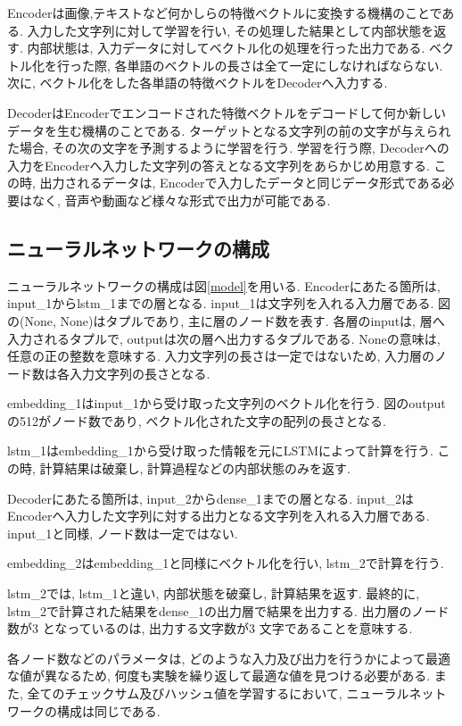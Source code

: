 \documentclass[11pt]{jbook}
\begin{document}
Encoderは画像,テキストなど何かしらの特徴ベクトルに変換する機構のことである.
入力した文字列に対して学習を行い, その処理した結果として内部状態を返す.
内部状態は, 入力データに対してベクトル化の処理を行った出力である.
ベクトル化を行った際, 各単語のベクトルの長さは全て一定にしなければならない.
次に, ベクトル化をした各単語の特徴ベクトルをDecoderへ入力する.

DecoderはEncoderでエンコードされた特徴ベクトルをデコードして何か新しいデータを生む機構のことである.
ターゲットとなる文字列の前の文字が与えられた場合, その次の文字を予測するように学習を行う.
学習を行う際, Decoderへの入力をEncoderへ入力した文字列の答えとなる文字列をあらかじめ用意する.
この時, 出力されるデータは, Encoderで入力したデータと同じデータ形式である必要はなく, 音声や動画など様々な形式で出力が可能である.

\subsection{ニューラルネットワークの構成}
ニューラルネットワークの構成は図\ref{model}を用いる.
Encoderにあたる箇所は, input\_1からlstm\_1までの層となる.
input\_1は文字列を入れる入力層である.
図の(None, None)はタプルであり, 主に層のノード数を表す.
各層のinputは, 層へ入力されるタプルで, outputは次の層へ出力するタプルである.
Noneの意味は, 任意の正の整数を意味する.
入力文字列の長さは一定ではないため, 入力層のノード数は各入力文字列の長さとなる.

embedding\_1はinput\_1から受け取った文字列のベクトル化を行う.
図のoutputの512がノード数であり, ベクトル化された文字の配列の長さとなる.

lstm\_1はembedding\_1から受け取った情報を元にLSTMによって計算を行う.
この時, 計算結果は破棄し, 計算過程などの内部状態のみを返す.

Decoderにあたる箇所は, input\_2からdense\_1までの層となる.
input\_2はEncoderへ入力した文字列に対する出力となる文字列を入れる入力層である.
input\_1と同様, ノード数は一定ではない.

embedding\_2はembedding\_1と同様にベクトル化を行い, lstm\_2で計算を行う.

lstm\_2では, lstm\_1と違い, 内部状態を破棄し, 計算結果を返す.
最終的に, lstm\_2で計算された結果をdense\_1の出力層で結果を出力する.
出力層のノード数が3 となっているのは, 出力する文字数が3 文字であることを意味する.

各ノード数などのパラメータは, どのような入力及び出力を行うかによって最適な値が異なるため, 何度も実験を繰り返して最適な値を見つける必要がある.
また, 全てのチェックサム及びハッシュ値を学習するにおいて, ニューラルネットワークの構成は同じである.
\end{document}
